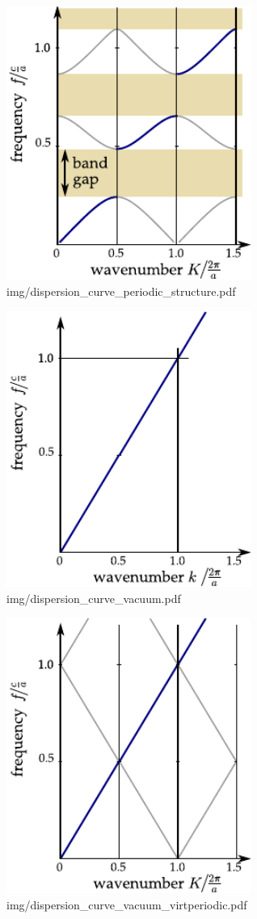\begin{figure} \caption{img/dispersion\_curve\_periodic\_structure.pdf}  \centering \includegraphics[width=8cm]{img/dispersion_curve_periodic_structure.pdf} \end{figure} \clearpage
\begin{figure} \caption{img/dispersion\_curve\_vacuum.pdf}  \centering \includegraphics[width=8cm]{img/dispersion_curve_vacuum.pdf} \end{figure} \clearpage
\begin{figure} \caption{img/dispersion\_curve\_vacuum\_virtperiodic.pdf} \centering \includegraphics[width=8cm]{img/dispersion_curve_vacuum_virtperiodic.pdf} \end{figure} \clearpage
